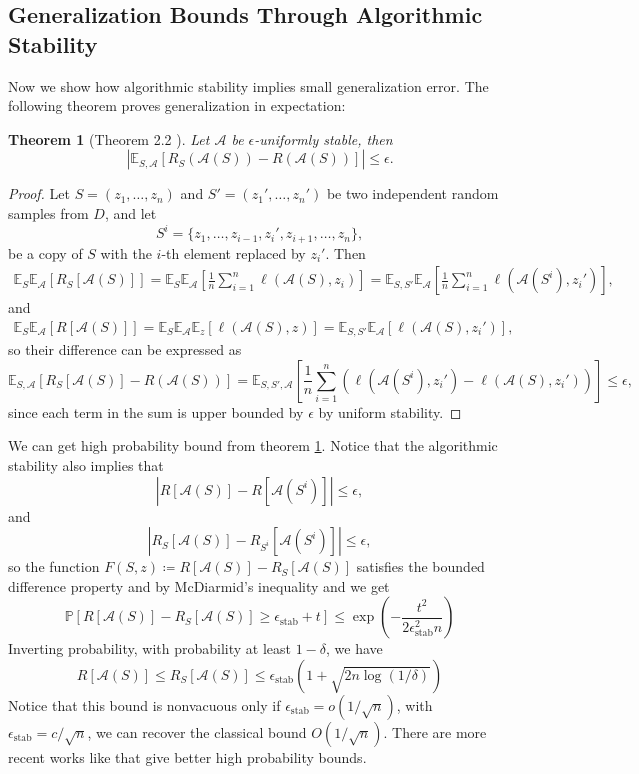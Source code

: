 \documentclass{article}[12pt]
\newtheorem{theorem}{Theorem}
\def\A{\mathcal{A}}
\def\E{\mathbb{E}}
\newcommand{\abs}[1]{\left\vert#1\right\vert}
\def \E{\mathbb{E}}
\begin{document}
\subsection{Generalization Bounds Through Algorithmic Stability}
Now we show how algorithmic stability implies small generalization error. The following theorem proves generalization in expectation:
\begin{theorem}[Theorem 2.2 \cite{trainfaster}] \label{expectation}
   Let $\A$ be $\epsilon$-uniformly stable, then 
   \[
   \abs{\E_{S, \A} \left[ R_S(\A(S)) - R(\A(S)) \right] }    \leq \epsilon.
   \]
\end{theorem}
\begin{proof}
Let $S = (z_1, \ldots, z_n)$ and $S' = (z_1', \ldots, z_n')$ be two independent random samples from $D$, and let
\[
S^{i} = \{z_1, \ldots, z_{i-1}, z_i', z_{i+1}, \ldots, z_n\},   
\] be a copy of $S$ with the $i$-th element replaced by $z_i'$. Then 
\begin{align*}
   \E_S \E_\A [R_S[\A(S)]] = \E_S \E_\A \left[ \frac{1}{n} \sum_{i=1}^n \ell(\A(S), z_i) \right]  = \E_{S, S'} \E_\A \left[\frac{1}{n} \sum_{i=1}^n \ell(\A(S^{i}), z_i') \right], 
\end{align*}
and 
\begin{align*}
   \E_S \E_\A[R[\A(S)]] = \E_S \E_\A \E_z[\ell(\A(S), z)] = \E_{S, S'} \E_\A [\ell(\A(S), z_i')], 
\end{align*} so their difference can be expressed as 
\[
\E_{S, \A}[R_S[\A(S)] - R(\A(S))]  = \E_{S, S', \A} \left[ \frac{1}{n}\sum_{i=1}^n \left( \ell(\A(S^i), z_i') - \ell(\A(S), z_i') \right) \right] \leq \epsilon,
\] since each term in the sum is upper bounded by $\epsilon$ by uniform stability.
\end{proof}
We can get high probability bound from theorem \ref{expectation}. 
Notice that the algorithmic stability also implies that 
\[
\abs{R[\A(S)] - R[\A(S^i)]}  \leq \epsilon, 
\] and 
\[
\abs{R_S[\A(S)] - R_{S^i}[\A(S^i)]}  \leq \epsilon, 
\] so the function $F(S, z) \coloneqq R[\A(S)] - R_S[\A(S)]$ satisfies the bounded difference property and by McDiarmid's inequality and we get
\[
   \mathbb{P}\left[R[\mathcal{A}(S)]-R_{S}[\mathcal{A}(S)] \geq \epsilon_{\mathrm{stab}}+t\right] \leq \exp \left(-\frac{t^{2}}{2 \epsilon_{\mathrm{stab}}^{2} n}\right)   
\]
Inverting probability, with probability at least $1 - \delta$, we have 
\begin{equation}
   \label{eq:highprob}
R[\A(S)] \leq R_S[\A(S)] \leq \epsilon_{\text{stab}}\left( 1+ \sqrt{2n\log(1/\delta)} \right)   
\end{equation}
Notice that this bound is nonvacuous only if $\epsilon_{\text{stab}} = o(1/\sqrt{n})$, with $\epsilon_{\text{stab}} = c/\sqrt{n}$, we can recover the classical bound $O(1/\sqrt{n})$. There are more recent works like \cite{betterrate} that give better high probability bounds. 
\end{document}
